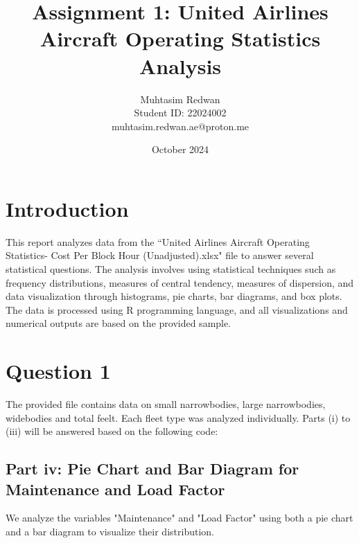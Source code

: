 \documentclass[a4paper,12pt]{article}
\title{Assignment 1: United Airlines Aircraft Operating Statistics Analysis}
\author{Muhtasim Redwan \\ Student ID: 22024002 \\ muhtasim.redwan.ae@proton.me}
\date{October 2024}
\begin{document}
\maketitle

\section*{Introduction}
This report analyzes data from the ``United Airlines Aircraft Operating Statistics- Cost Per Block Hour (Unadjusted).xlsx" file
to answer several statistical questions. The analysis involves using statistical techniques 
such as frequency distributions, measures of central tendency, measures of dispersion, and data visualization 
through histograms, pie charts, bar diagrams, and box plots.
The data is processed using R programming language, and all visualizations and numerical outputs are based on the provided sample.

\section{Question 1}
The provided file contains data on small narrowbodies, large narrowbodies, widebodies and total feelt. Each fleet
type was analyzed individually. Parts (i) to (iii) will be answered based on the following code:








\subsection{Part iv: Pie Chart and Bar Diagram for Maintenance and Load Factor}
We analyze the variables "Maintenance" and "Load Factor" using both a pie chart and a bar diagram to visualize their distribution.
\end{document}
